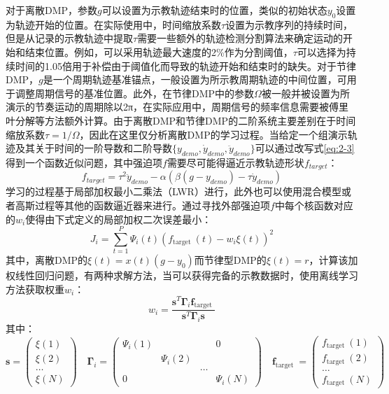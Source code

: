 对于离散DMP，参数$g$可以设置为示教轨迹结束时的位置，类似的初始状态$y_0$设置为轨迹开始的位置。在实际使用中，时间缩放系数$τ$设置为示教序列的持续时间，但是从记录的示教轨迹中提取$τ$需要一些额外的轨迹检测分割算法来确定运动的开始和结束位置\cite{tanApplyingAdaptiveControlb}。例如，可以采用轨迹最大速度的2\%作为分割阈值，$τ$可以选择为持续时间的1.05倍用于补偿由于阈值化而导致的轨迹开始和结束时的缺失。对于节律DMP，$g$是一个周期轨迹基准锚点，一般设置为所示教周期轨迹的中间位置，可用于调整周期信号的基准位置。此外，在节律DMP中的参数$\Omega$被一般并被设置为所演示的节奏运动的周期除以2π，在实际应用中，周期信号的频率信息需要被傅里叶分解等方法额外计算。由于离散DMP和节律DMP的二阶系统主要差别在于时间缩放系数$\tau = 1/\Omega$，因此在这里仅分析离散DMP的学习过程。当给定一个组演示轨迹及其关于时间的一阶导数和二阶导数$\{y_{demo},\dot{y}_{demo},\ddot{y}_{demo} \}$可以通过改写式\ref{eq:2-3}得到一个函数近似问题，其中强迫项$f$需要尽可能得逼近示教轨迹形状$f_{target}$：
\begin{equation}
    f_{target}=\tau^2 \ddot{y}_{demo}-\alpha\left(\beta\left(g-y_{demo}\right)-\tau \dot{y}_{demo}\right)
    \label{eq:2-13}
\end{equation}
学习的过程基于局部加权最小二乘法（LWR）进行\cite{schaalConstructiveIncrementalLearning1998}，此外也可以使用混合模型或者高斯过程等其他的函数逼近器来进行。通过寻找外部强迫项$f$中每个核函数对应的$w_i$使得由下式定义的局部加权二次误差最小：
\begin{equation}
    J_i=\sum_{t=1}^P \Psi_i(t)\left(f_{\text {target }}(t)-w_i \xi(t)\right)^2
    \label{eq:2-14}
\end{equation}
其中，离散DMP的$ξ(t) = x(t)(g−y_0)$而节律型DMP的$ξ(t) = r$，计算该加权线性回归问题，有两种求解方法，当可以获得完备的示教数据时，使用离线学习方法获取权重$w_i$：
\begin{equation}
    w_i=\frac{\mathbf{s}^T \boldsymbol{\Gamma}_i \mathbf{f}_{\text {target }}}{\mathbf{s}^T \boldsymbol{\Gamma}_i \mathbf{s}}
    \label{eq:2-15}
\end{equation}
其中：
\begin{equation}
    \mathbf{s}=\left(\begin{array}{c}
    \xi(1) \\
    \xi(2) \\
    \ldots \\
    \xi(N)
    \end{array}\right) \quad \boldsymbol{\Gamma}_i=\left(\begin{array}{cccc}
    \Psi_i(1) & & & 0 \\
    & \Psi_i(2) & & \\
    & & \ldots & \\
    0 & & & \Psi_i(N)
    \end{array}\right) \quad \mathbf{f}_{\text {target }}=\left(\begin{array}{c}
    f_{\text {target }}(1) \\
    f_{\text {target }}(2) \\
    \ldots \\
    f_{\text {target }}(N)
    \end{array}\right)
    \label{eq:2-16}
\end{equation}
